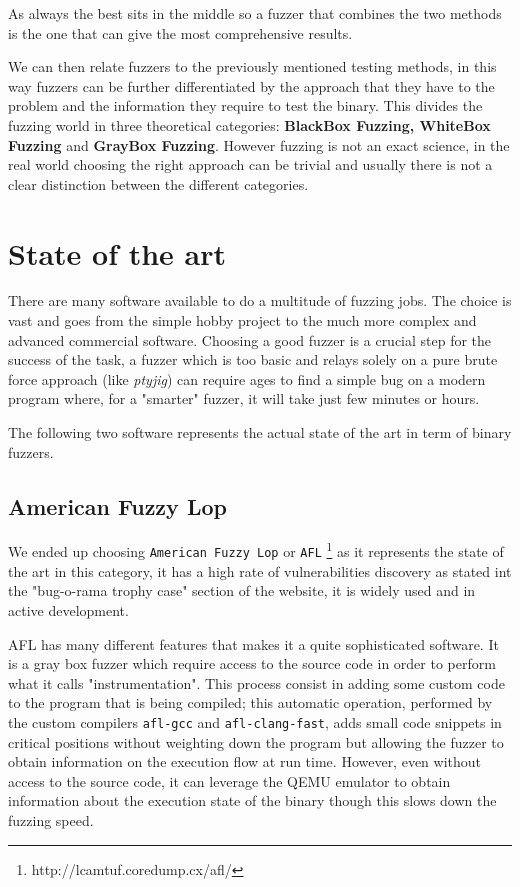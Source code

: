 \documentclass[../main.tex]{subfiles}
\begin{document}
As always the best sits in the middle so a fuzzer that combines the two methods is the one that can give the most comprehensive results.

We can then relate fuzzers to the previously mentioned testing methods, in this way fuzzers can be further differentiated by the approach that they have to
the problem and the information they require to test the binary. This divides
the fuzzing world in three theoretical categories: \textbf{BlackBox Fuzzing,
WhiteBox Fuzzing} and \textbf{GrayBox Fuzzing}. However fuzzing is not an exact
science, in the real world choosing the right approach can be trivial
and usually there is not a clear distinction between the different categories.


\section{State of the art}
There are many software available to do a multitude of fuzzing jobs. The choice is vast and goes from the simple hobby project to the much more complex and advanced commercial software. Choosing a good fuzzer is a crucial step for the success of the task, a fuzzer which is too basic and relays solely on a pure brute force approach (like \textit{ptyjig}) can require ages to find a simple bug on a modern program where, for a "smarter" fuzzer, it will take just few minutes or hours.

The following two software represents the actual state of the art in term of binary fuzzers.


\subsection{American Fuzzy Lop}

We ended up choosing \texttt{American Fuzzy Lop} or \texttt{AFL}
\footnote{http://lcamtuf.coredump.cx/afl/} as it represents the state of the art
in this category, it has a high rate of vulnerabilities discovery as stated int
the "bug-o-rama trophy case" section of the website, it is widely used and in
active development.

AFL has many different features that makes it a quite sophisticated software. It
is a gray box fuzzer which require access to the source code in order to perform
what it calls "instrumentation". This process consist in adding some custom code
to the program that is being compiled; this automatic operation, performed by
the custom compilers \texttt{afl-gcc} and \texttt{afl-clang-fast}, adds small
code snippets in critical positions without weighting down the program but
allowing the fuzzer to obtain information on the execution flow at run time.
However, even without access to the source code, it can leverage the QEMU
emulator to obtain information about the execution state of the binary though
this slows down the fuzzing speed.
\end{document}
